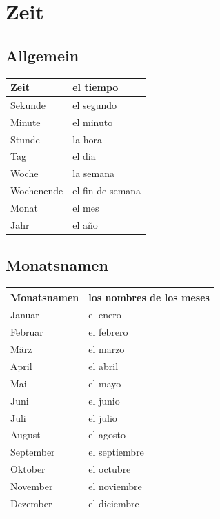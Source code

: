 \documentclass[10pt,spanish]{report}
\begin{document}
\chapter*{Zeit}
\section*{Allgemein}
\begin{longtable}{p{} | p{}} 
\textbf{Zeit}     & \textbf{el tiempo}                                       \\ \hline
\hline
\endhead %
Sekunde & el segundo\\
Minute & el minuto\\
Stunde & la hora\\
Tag & el dia\\
Woche & la semana\\
Wochenende & el fin de semana\\
Monat & el mes\\
Jahr & el a\~{n}o\\

\end{longtable}

\section*{Monatsnamen}
\begin{longtable}{p{} | p{}} 
\textbf{Monatsnamen}     & \textbf{los nombres de los meses}                                       \\ \hline
\hline
\endhead %
Januar & el enero\\
Februar & el febrero\\
März & el marzo\\
April & el abril\\
Mai & el mayo\\
Juni & el junio\\
Juli & el julio\\
August & el agosto\\
September & el septiembre\\
Oktober & el octubre\\
November & el noviembre \\
Dezember & el diciembre \\
\end{longtable}
\end{document}
